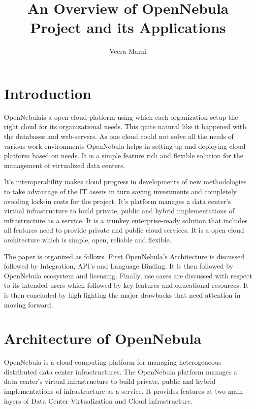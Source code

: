\documentclass[9pt,twocolumn,twoside]{styles/osajnl}
\title{An Overview of OpenNebula Project and its Applications}
\author[1]{Veera Marni}
\affil[1]{School of Informatics and Computing, Bloomington, IN 47408, U.S.A.}
\affil[*]{Corresponding authors: vmarni@umail.iu.edu}
\begin{document}
\maketitle

\section{Introduction} 

{OpenNebula}\cite{www-wiki-opennebula}is a open cloud platform 
using which each organization setup the right cloud for its 
organizational needs. This quite natural like it happened with the 
databases and web-servers. {As one cloud could not solve all the 
needs of various work environments OpenNebula helps in setting up and 
deploying cloud platform based on needs}\cite{www-about-opennebula}. 
It is a simple feature rich and flexible solution for the management 
of virtualized data centers.

It's interoperability makes cloud progress in developments of new 
methodologies to take advantage of the IT assets in turn saving 
investments and completely avoiding lock-in costs for the project. 
It's platform manages a data center's virtual infrastructure to build 
private, public and hybrid implementations of infrastructure as a 
service. It is a trunkey enterprise-ready solution that includes all 
features need to provide private and public cloud services. It is a 
open cloud architecture which is simple, open, reliable and 
flexible. 

The paper is organized as follows. First OpenNebula's Architecture is 
discussed followed by Integration, API's and Language Binding. It is 
then followed by OpenNebula ecosystem and licensing. Finally, use 
cases are discussed with respect to its intended users which followed 
by key features and educational resources. It is then concluded by 
high lighting the major drawbacks that need attention in moving 
forward.


\section{Architecture of OpenNebula}

OpenNebula is a cloud computing platform for managing heterogeneous 
distributed data center  infrastructures. The OpenNebula platform 
manages a data center's virtual infrastructure to build private, 
public and hybrid implementations of infrastructure as a service. It 
provides features at two main layers of Data Center Virtualization 
and Cloud Infrastructure.
\end{document}
